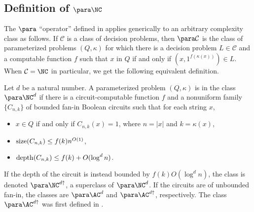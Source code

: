 \subsection{Definition of \texorpdfstring{$\para \NC$}{paraNC}}

%
%
%
%
%
%
%
%
%
%
%
%
%

%
%
%
%
%
%
%
%

The $\para$ ``operator'' defined in \autocite{fg03} applies generically to an arbitrary complexity class as follows.
If $\mathcal{C}$ is a class of decision problems, then $\para \mathcal{C}$ is the class of parameterized problems $(Q, \kappa)$ for which there is a decision problem $L \in \mathcal{C}$ and a computable function $f$ such that $x$ in $Q$ if and only if $(x, 1^{f(\kappa(x))}) \in L$.
When $\mathcal{C} = \NC$ in particular, we get the following equivalent definition.

\begin{definition}[$\para \NC^d$]
  Let $d$ be a natural number.
  A parameterized problem $(Q, \kappa)$ is in the class $\para \NC^d$ if there is a circuit-computable function $f$ and a nonuniform family $\{C_{n, k}\}$ of bounded fan-in Boolean circuits such that for each string $x$,
  \begin{itemize}
  \item $x \in Q$ if and only if $C_{n, k}(x) = 1$, where $n = |x|$ and $k = \kappa(x)$,
  \item $\operatorname{size}(C_{n, k}) \leq f(k) n^{O(1)}$,
  \item $\operatorname{depth}(C_{n, k}) \leq f(k) + O(\log^d n)$.
  \end{itemize}
\end{definition}

If the depth of the circuit is instead bounded by $f(k) O(\log^d n)$, the class is denoted $\para \NC^{d \uparrow}$, a superclass of $\para \NC^d$.
If the circuits are of unbounded fan-in, the classes are $\para \AC^d$ and $\para \AC^{d \uparrow}$, respectively.
The class $\para \AC^{d \uparrow}$ was first defined in \autocite{bst15}.

